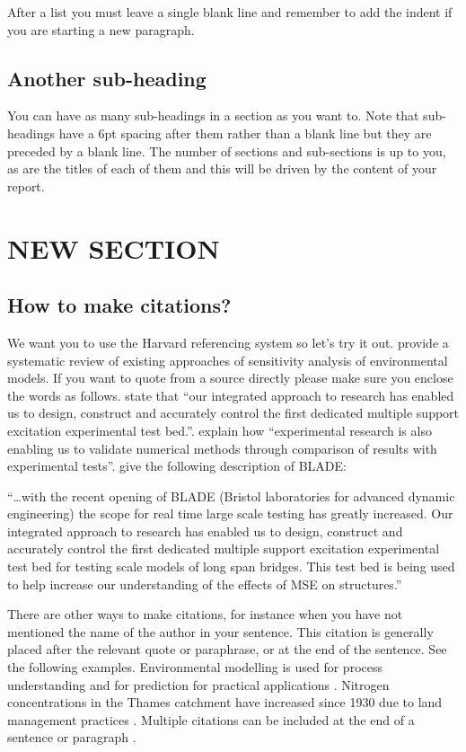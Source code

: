 \documentclass[a4paper,10pt]{article}
\begin{document}
After a list you must leave a single blank line and remember to add the indent if you are starting a new paragraph.

\subsection{Another sub-heading}

You can have as many sub-headings in a section as you want to. Note that sub-headings have a 6pt spacing after them rather than a blank line but they are preceded by a blank line. The number of sections and sub-sections is up to you, as are the titles of each of them and this will be driven by the content of your report.

\section{NEW SECTION}

\subsection{How to make citations?}

We want you to use the Harvard referencing system so let’s try it out. \cite{pianosi2016} provide a  systematic review of existing approaches of sensitivity analysis of environmental models. If you want to quote from a source directly please make sure you enclose the words as follows. \cite{norman2006} state that “our integrated approach to research has enabled us to design, construct and accurately control the first dedicated multiple support excitation experimental test bed.”.   \cite{smith2006} explain how “experimental research is also enabling us to validate numerical methods through comparison of results with experimental tests”. \cite{norman2006} give the following description of BLADE: 

“…with the recent opening of BLADE (Bristol laboratories for advanced dynamic engineering) the scope for real time large scale testing has greatly increased. Our integrated approach to research has enabled us to design, construct and accurately control the first dedicated multiple support excitation experimental test bed for testing scale models of long span bridges. This test bed is being used to help increase our understanding of the effects of MSE on structures.”

There are other ways to make citations, for instance when you have not mentioned the name of the author in your sentence. This citation is generally placed after the relevant quote or paraphrase, or at the end of the sentence. See the following examples. Environmental modelling is used for process understanding and for prediction for practical applications \citep{beven2018}.  Nitrogen concentrations in the Thames catchment have increased since 1930 due to land management practices \citep{howden2011}. Multiple citations can be included at the end of a sentence or paragraph \citep{beven2018, howden2011}. 
\end{document}
